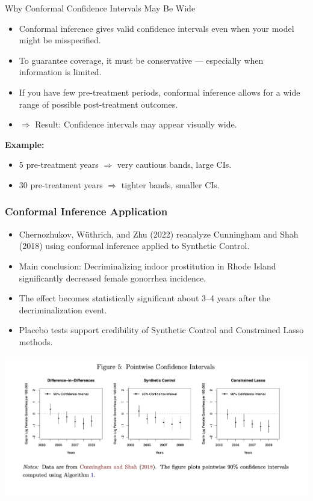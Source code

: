 \documentclass{beamer}
\begin{document}
\begin{frame}{Why Conformal Confidence Intervals May Be Wide}
\small
\begin{itemize}
  \item Conformal inference gives valid confidence intervals even when your model might be misspecified.
  \item To guarantee coverage, it must be conservative — especially when information is limited.
  \item If you have few pre-treatment periods, conformal inference allows for a wide range of possible post-treatment outcomes.
  \item $\Rightarrow$ Result: Confidence intervals may appear visually wide.
\end{itemize}

\vspace{0.5cm}

\textbf{Example:}
\begin{itemize}
  \item 5 pre-treatment years $\Rightarrow$ very cautious bands, large CIs.
  \item 30 pre-treatment years $\Rightarrow$ tighter bands, smaller CIs.
\end{itemize}
\end{frame}


\begin{frame}
\frametitle{Conformal Inference Application}

\begin{itemize}
  \item Chernozhukov, Wüthrich, and Zhu (2022) reanalyze Cunningham and Shah (2018) using conformal inference applied to Synthetic Control.
  \item Main conclusion: Decriminalizing indoor prostitution in Rhode Island significantly decreased female gonorrhea incidence.
  \item The effect becomes statistically significant about 3–4 years after the decriminalization event.
  \item Placebo tests support credibility of Synthetic Control and Constrained Lasso methods.
\end{itemize}


\vspace{0.5cm}
\begin{center}
\includegraphics[width=0.7\linewidth]{./lecture_includes/figure5_conformal.png}
\end{center}

\end{frame}
\end{document}
